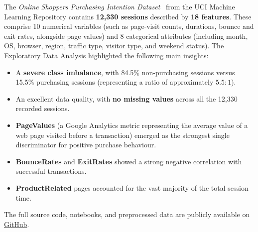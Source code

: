 The \textit{Online Shoppers Purchasing Intention Dataset}~\cite{sakar2019} from the UCI Machine Learning Repository contains \textbf{12,330 sessions} described by \textbf{18 features}. These comprise 10 numerical variables (such as page-visit counts, durations, bounce and exit rates, alongside page values) and 8 categorical attributes (including month, OS, browser, region, traffic type, visitor type, and weekend status). The Exploratory Data Analysis %
highlighted the following main insights:

\begin{itemize}
    \item A \textbf{severe class imbalance}, with 84.5\% non-purchasing sessions versus 15.5\% purchasing sessions (representing a ratio of approximately $5.5:1$).
    \item An excellent data quality, with \textbf{no missing values} across all the 12,330 recorded sessions.
    \item \textbf{PageValues} (a Google Analytics metric representing the average value of a web page visited before a transaction) emerged as the strongest single discriminator for positive purchase behaviour.
    \item \textbf{BounceRates} and \textbf{ExitRates} showed a strong negative correlation with successful transactions.
    \item \textbf{ProductRelated} pages accounted for the vast majority of the total session time.
\end{itemize}

\noindent The full source code, notebooks, and preprocessed data are publicly available on \href{https://github.com/davidemeta/Predicting-Online-Shoppers-Purchasing-Intention}{GitHub}.
